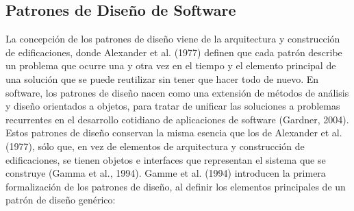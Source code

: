 \documentclass[twoside,twocolumn]{article}
\begin{document}
\subsection{ Patrones de Diseño de Software}
La concepción de los patrones de diseño viene de la arquitectura y construcción de edificaciones, donde Alexander et al. (1977) definen que cada patrón describe un problema que ocurre una y otra vez en el tiempo y el elemento principal de una solución que se puede reutilizar sin tener que hacer todo de nuevo.  
En software, los patrones de diseño nacen como una extensión de métodos de análisis y diseño orientados a objetos, para tratar de unificar las soluciones a problemas recurrentes en el desarrollo cotidiano de aplicaciones de software (Gardner, 2004). Estos patrones de diseño conservan la misma esencia que los de Alexander et al. (1977), sólo que, en vez de elementos de arquitectura y construcción de edificaciones, se tienen objetos e interfaces que representan el sistema que se construye (Gamma et al., 1994).  
Gamme et al. (1994) introducen la primera formalización de los patrones de diseño, al definir los elementos principales de un patrón de diseño genérico: 
\end{document}
